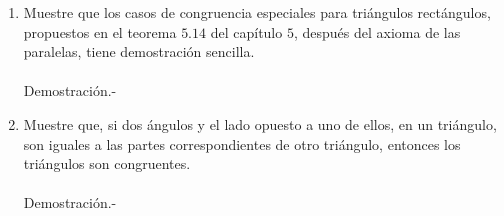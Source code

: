 \documentclass[10pt]{article}
\begin{document}
\begin{enumerate}
\item Muestre que los casos de congruencia especiales para triángulos rectángulos, propuestos en el teorema $5.14$ del capítulo $5$, después del axioma de las paralelas, tiene demostración sencilla.\\\\
    Demostración.-\;

\item Muestre que, si dos ángulos y el lado opuesto a uno de ellos, en un triángulo, son iguales a las partes correspondientes de otro triángulo, entonces los triángulos son congruentes. \\\\
    Demostración.-\; 


\end{enumerate}
\end{document}
